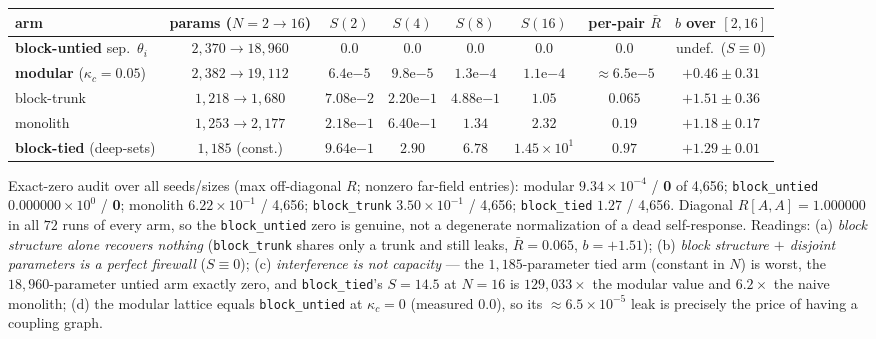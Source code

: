 \documentclass[11pt]{article}
\begin{document}
\begin{center}\footnotesize\setlength{\tabcolsep}{3pt}
\begin{tabular}{lccccccc}
\toprule
arm & params ($N{=}2{\to}16$) & $S(2)$ & $S(4)$ & $S(8)$ & $S(16)$ & per-pair $\bar R$ & $b$ over $[2,16]$ \\
\midrule
\textbf{block-untied} sep.\ $\theta_i$ & $2{,}370\to18{,}960$ & $\mathbf{0.0}$ & $\mathbf{0.0}$ & $\mathbf{0.0}$ & $\mathbf{0.0}$ & $\mathbf{0.0}$ & undef.\ ($S\equiv0$) \\
\textbf{modular} ($\kappa_c{=}0.05$) & $2{,}382\to19{,}112$ & $6.4\mathrm{e}{-5}$ & $9.8\mathrm{e}{-5}$ & $1.3\mathrm{e}{-4}$ & $1.1\mathrm{e}{-4}$ & ${\approx}6.5\mathrm{e}{-5}$ & $+0.46\pm0.31$ \\
block-trunk & $1{,}218\to1{,}680$ & $7.08\mathrm{e}{-2}$ & $2.20\mathrm{e}{-1}$ & $4.88\mathrm{e}{-1}$ & $1.05$ & $0.065$ & $+1.51\pm0.36$ \\
monolith & $1{,}253\to2{,}177$ & $2.18\mathrm{e}{-1}$ & $6.40\mathrm{e}{-1}$ & $1.34$ & $2.32$ & $0.19$ & $+1.18\pm0.17$ \\
\textbf{block-tied} (deep-sets) & $1{,}185$ (const.) & $9.64\mathrm{e}{-1}$ & $2.90$ & $6.78$ & $1.45\times10^{1}$ & $\mathbf{0.97}$ & $+1.29\pm0.01$ \\
\bottomrule
\end{tabular}
\end{center}

Exact-zero audit over all seeds/sizes (max off-diagonal $R$; nonzero far-field entries): modular $9.34\times10^{-4}$ / \textbf{0} of 4,656; \texttt{block\_untied} $0.000000\times10^{0}$ / \textbf{0}; monolith $6.22\times10^{-1}$ / 4,656; \texttt{block\_trunk} $3.50\times10^{-1}$ / 4,656; \texttt{block\_tied} $1.27$ / 4,656. Diagonal $R[A,A]=1.000000$ in all $72$ runs of every arm, so the \texttt{block\_untied} zero is genuine, not a degenerate normalization of a dead self-response. Readings: (a) \emph{block structure alone recovers nothing} (\texttt{block\_trunk} shares only a trunk and still leaks, $\bar R=0.065$, $b=+1.51$); (b) \emph{block structure $+$ disjoint parameters is a perfect firewall} ($S\equiv0$); (c) \emph{interference is not capacity} --- the $1{,}185$-parameter tied arm (constant in $N$) is worst, the $18{,}960$-parameter untied arm exactly zero, and \texttt{block\_tied}'s $S=14.5$ at $N=16$ is $129{,}033\times$ the modular value and $6.2\times$ the naive monolith; (d) the modular lattice equals \texttt{block\_untied} at $\kappa_c=0$ (measured $0.0$), so its ${\approx}6.5\times10^{-5}$ leak is precisely the price of having a coupling graph.
\end{document}
